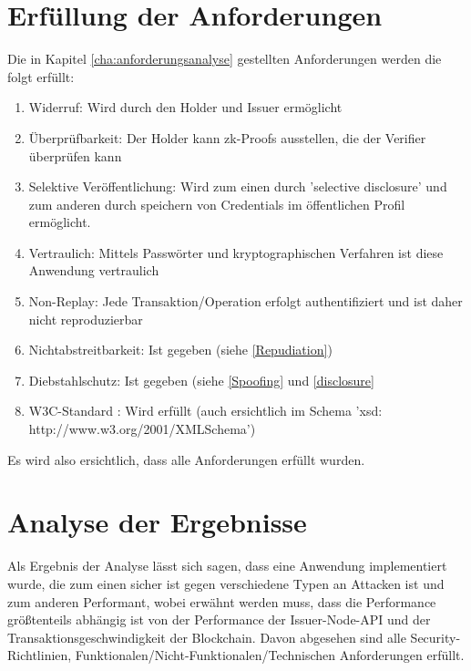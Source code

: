 \section{Erfüllung der Anforderungen}
Die in Kapitel \ref{cha:anforderungsanalyse} gestellten Anforderungen werden die folgt erfüllt:
\begin{enumerate}
	\item Widerruf: Wird durch den Holder und Issuer ermöglicht
	\item Überprüfbarkeit: Der Holder kann zk-Proofs ausstellen, die der Verifier überprüfen kann
	\item Selektive Veröffentlichung: Wird zum einen durch 'selective disclosure' und zum anderen durch speichern von Credentials im öffentlichen Profil ermöglicht.
	\item Vertraulich: Mittels Passwörter und kryptographischen Verfahren ist diese Anwendung vertraulich
	\item Non-Replay: Jede Transaktion/Operation erfolgt authentifiziert und ist daher nicht reproduzierbar
	\item Nichtabstreitbarkeit: Ist gegeben (siehe \ref{Repudiation})
	\item Diebstahlschutz: Ist gegeben (siehe \ref{Spoofing} und \ref{disclosure}
	\item W3C-Standard : Wird erfüllt (auch ersichtlich im Schema 'xsd: http://www.w3.org/2001/XMLSchema')
\end{enumerate}
Es wird also ersichtlich, dass alle Anforderungen erfüllt wurden.
\section{Analyse der Ergebnisse}
Als Ergebnis der Analyse lässt sich sagen, dass eine Anwendung implementiert wurde, die zum einen sicher ist gegen verschiedene Typen an Attacken ist und zum anderen Performant, wobei erwähnt werden muss, dass die Performance größtenteils abhängig ist von der Performance der Issuer-Node-API und der Transaktionsgeschwindigkeit der Blockchain. Davon abgesehen sind alle Security-Richtlinien, Funktionalen/Nicht-Funktionalen/Technischen Anforderungen erfüllt.



